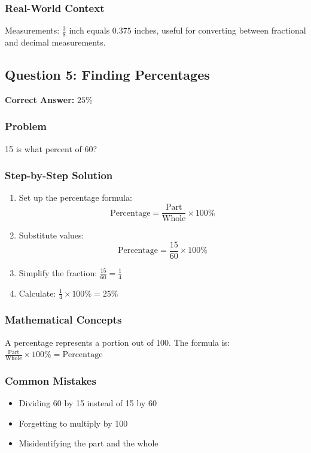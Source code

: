 \documentclass[12pt,a4paper]{article}
\begin{document}
\subsubsection*{Real-World Context}
Measurements: $\frac{3}{8}$ inch equals $0.375$ inches, useful for converting between fractional and decimal measurements.

\vspace{0.5cm}

\subsection*{Question 5: Finding Percentages}

\textbf{Correct Answer:} $25\%$

\subsubsection*{Problem}
15 is what percent of 60?

\subsubsection*{Step-by-Step Solution}
\begin{enumerate}
    \item Set up the percentage formula:
    \[\text{Percentage} = \frac{\text{Part}}{\text{Whole}} \times 100\%\]
    \item Substitute values:
    \[\text{Percentage} = \frac{15}{60} \times 100\%\]
    \item Simplify the fraction: $\frac{15}{60} = \frac{1}{4}$
    \item Calculate: $\frac{1}{4} \times 100\% = 25\%$
\end{enumerate}

\subsubsection*{Mathematical Concepts}
A percentage represents a portion out of 100. The formula is: $\frac{\text{Part}}{\text{Whole}} \times 100\% = \text{Percentage}$

\subsubsection*{Common Mistakes}
\begin{itemize}
    \item Dividing 60 by 15 instead of 15 by 60
    \item Forgetting to multiply by 100
    \item Misidentifying the part and the whole
\end{itemize}
\end{document}
